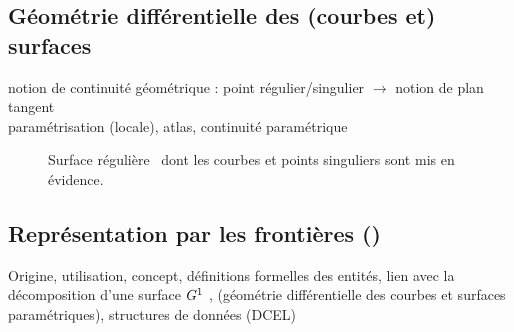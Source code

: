 \subsection{Géométrie différentielle des (courbes et) surfaces}
notion de continuité géométrique : point régulier/singulier $\to$ notion de plan tangent\\
paramétrisation (locale), atlas, continuité paramétrique

\begin{figure}
	\centering
	
	\caption{Surface régulière \piecewise\ dont les courbes et points singuliers sont mis en évidence.}
	\label{fig:piecewise_smooth_surface_decomposition}
\end{figure}


\subsection{Représentation par les frontières (\brep)}
Origine, utilisation, concept, définitions formelles des entités, lien avec la décomposition d'une surface $G^{1}$ \piecewise, (géométrie différentielle des courbes et surfaces paramétriques), structures de données (DCEL)

